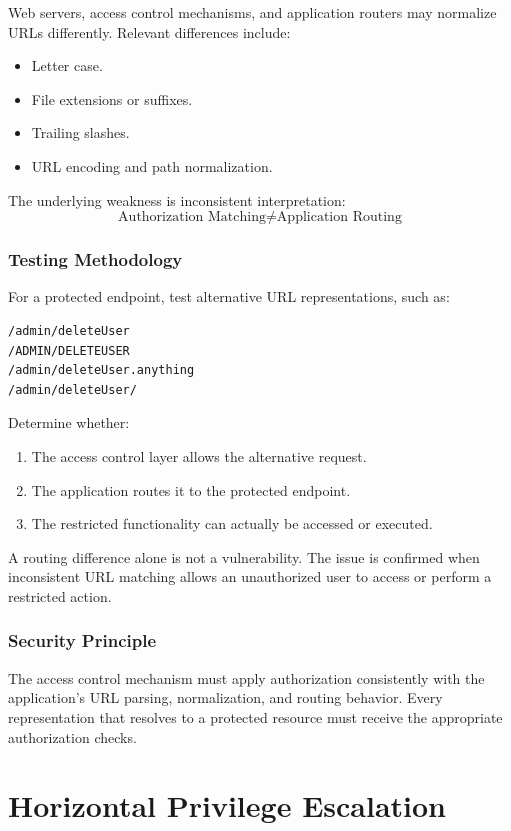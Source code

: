 \documentclass[11pt,a4paper]{article}
\begin{document}
Web servers, access control mechanisms, and application routers may normalize URLs differently. Relevant differences include:
\begin{itemize}
    \item Letter case.
    \item File extensions or suffixes.
    \item Trailing slashes.
    \item URL encoding and path normalization.
\end{itemize}

The underlying weakness is inconsistent interpretation:
\[
    \text{Authorization Matching}
    \neq
    \text{Application Routing}
\]

\subsubsection{Testing Methodology}

For a protected endpoint, test alternative URL representations, such as:
\begin{lstlisting}
/admin/deleteUser
/ADMIN/DELETEUSER
/admin/deleteUser.anything
/admin/deleteUser/
\end{lstlisting}

Determine whether:
\begin{enumerate}
    \item The access control layer allows the alternative request.
    \item The application routes it to the protected endpoint.
    \item The restricted functionality can actually be accessed or executed.
\end{enumerate}

A routing difference alone is not a vulnerability. The issue is confirmed when inconsistent URL matching allows an unauthorized user to access or perform a restricted action.

\subsubsection{Security Principle}

The access control mechanism must apply authorization consistently with the application's URL parsing, normalization, and routing behavior. Every representation that resolves to a protected resource must receive the appropriate authorization checks.

\newpage
\section{Horizontal Privilege Escalation}
\end{document}
